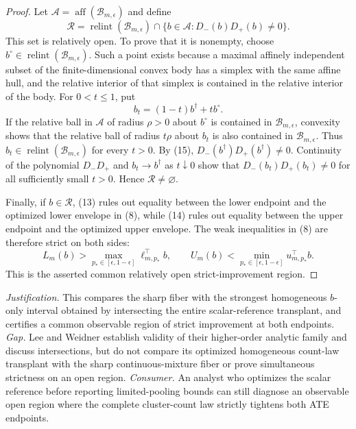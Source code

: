 \documentclass{article}
\begin{document}
\begin{proof}
Let \(\mathcal A=\operatorname{aff}(\mathcal B_{m,\epsilon})\) and define
\[
\mathcal R=
\operatorname{relint}(\mathcal B_{m,\epsilon})
\cap\{b\in\mathcal A:D_-(b)D_+(b)\neq0\}.                        \tag{16}
\]
This set is relatively open. To prove that it is nonempty, choose
\(b^\circ\in\operatorname{relint}(\mathcal B_{m,\epsilon})\). Such a point
exists because a maximal affinely independent subset of the finite-dimensional
convex body has a simplex with the same affine hull, and the relative interior
of that simplex is contained in the relative interior of the body. For
\(0<t\leq1\), put
\[
b_t=(1-t)b^\dagger+t b^\circ.
\]
If the relative ball in \(\mathcal A\) of radius \(\rho>0\) about
\(b^\circ\) is contained in \(\mathcal B_{m,\epsilon}\), convexity shows that
the relative ball of radius \(t\rho\) about \(b_t\) is also contained in
\(\mathcal B_{m,\epsilon}\). Thus
\(b_t\in\operatorname{relint}(\mathcal B_{m,\epsilon})\) for every \(t>0\).
By (15), \(D_-(b^\dagger)D_+(b^\dagger)\neq0\). Continuity of the polynomial
\(D_-D_+\) and \(b_t\to b^\dagger\) as \(t\downarrow0\) show that
\(D_-(b_t)D_+(b_t)\neq0\) for all sufficiently small \(t>0\). Hence
\(\mathcal R\neq\varnothing\).

Finally, if \(b\in\mathcal R\), (13) rules out equality between the lower
endpoint and the optimized lower envelope in (8), while (14) rules out equality
between the upper endpoint and the optimized upper envelope. The weak
inequalities in (8) are therefore strict on both sides:
\[
L_m(b)>\max_{p_*\in[\epsilon,1-\epsilon]}
\ell_{m,p_*}^{\top}b,
\qquad
U_m(b)<\min_{p_*\in[\epsilon,1-\epsilon]}
u_{m,p_*}^{\top}b.
\]
This is the asserted common relatively open strict-improvement region.
\end{proof}
\par\smallskip\noindent \textit{Justification.} This compares the sharp fiber with the strongest homogeneous \(b\)-only interval obtained by intersecting the entire scalar-reference transplant, and certifies a common observable region of strict improvement at both endpoints. \textit{Gap.} Lee and Weidner establish validity of their higher-order analytic family and discuss intersections, but do not compare its optimized homogeneous count-law transplant with the sharp continuous-mixture fiber or prove simultaneous strictness on an open region. \textit{Consumer.} An analyst who optimizes the scalar reference before reporting limited-pooling bounds can still diagnose an observable open region where the complete cluster-count law strictly tightens both ATE endpoints.
\end{document}
